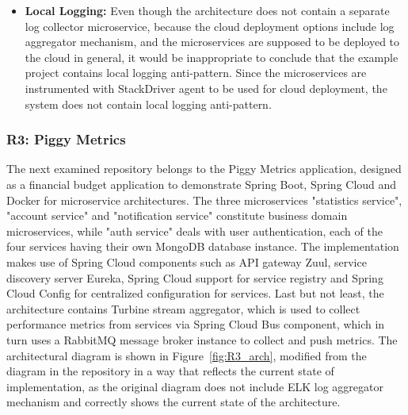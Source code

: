 \documentclass{Configuration_Files/PoliMi3i_thesis}
\begin{document}
\begin{itemize}
    \item \textbf{Local Logging:} Even though the architecture does not contain a separate log collector microservice, because the cloud deployment options include log aggregator mechanism, and the microservices are supposed to be deployed to the cloud in general, it would be inappropriate to conclude that the example project contains local logging anti-pattern.
    Since the microservices are instrumented with StackDriver agent to be used for cloud deployment, the system does not contain local logging anti-pattern.
\end{itemize}

\subsubsection{R3: Piggy Metrics}
\label{subsubsec:R3}

The next examined repository belongs to the Piggy Metrics application, designed as a financial budget application to demonstrate Spring Boot, Spring Cloud and Docker for microservice architectures.
The three microservices "statistics service", "account service" and "notification service" constitute business domain microservices, while "auth service" deals with user authentication, each of the four services having their own MongoDB database instance.
The implementation makes use of Spring Cloud components such as API gateway Zuul\footnotemark[76], service discovery server Eureka, Spring Cloud support for service registry and Spring Cloud Config\footnotemark[77] for centralized configuration for services.
Last but not least, the architecture contains Turbine stream aggregator\footnotemark[78], which is used to collect performance metrics from services via Spring Cloud Bus\footnotemark[79] component, which in turn uses a RabbitMQ message broker instance to collect and push metrics.
The architectural diagram is shown in Figure~\ref{fig:R3_arch}, modified from the diagram in the repository in a way that reflects the current state of implementation, as the original diagram does not include ELK log aggregator mechanism and correctly shows the current state of the architecture.
\end{document}

